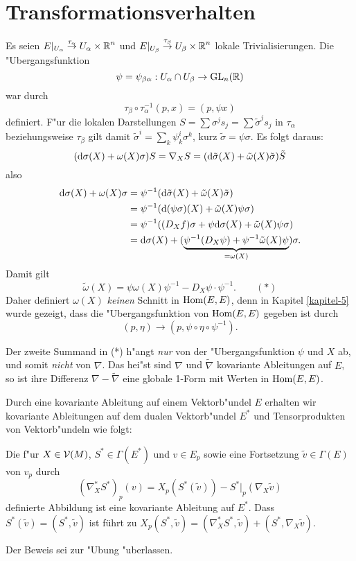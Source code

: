 \section{Transformationsverhalten}

Es seien $E|_{U_\alpha} \overset{\tau_\alpha}{\to} U_\alpha \times \operatorname{\mathbb{R}}^n$ und $E|_{U_\beta} \overset{\tau_\beta}{\to} U_{\beta} \times \operatorname{\mathbb{R}}^n$ lokale Trivialisierungen. Die "Ubergangsfunktion
	\[ \psi = \psi_{\beta\alpha}: U_\alpha \cap U_\beta \to \operatorname{GL}_n(\operatorname{\mathbb{R}}) \]
war durch
	\[ \tau_\beta \circ \tau_\alpha^{-1} (p,x) = (p, \psi x) \]
definiert. F"ur die lokalen Darstellungen $S = \sum \sigma^j s_j = \sum \tilde\sigma^j s_j$ in $\tau_\alpha$ beziehungsweise $\tau_\beta$ gilt damit $\tilde\sigma^{i} = \sum_k \psi_k^{i} \sigma^k$, kurz $\tilde\sigma = \psi \sigma$. Es folgt daraus:
	\[ (\mathrm{d} \sigma(X) + \omega(X) \sigma) S = \nabla_X S = (\mathrm{d} \tilde\sigma(X) + \tilde\omega(X)\tilde\sigma) \tilde S \]
also
\begin{align*}
	\mathrm{d} \sigma(X) + \omega(X) \sigma &= \psi^{-1}(\mathrm{d} \tilde\sigma(X) + \tilde\omega(X) \tilde\sigma)\\
	&= \psi^{-1} (\mathrm{d}(\psi\sigma)(X) + \tilde\omega(X) \psi \sigma)\\
	&= \psi^{-1} ((D_X f) \sigma + \psi \mathrm{d} \sigma(X) + \tilde\omega(X) \psi \sigma)\\
	&= \mathrm{d} \sigma(X) + (\underbrace{\psi^{-1}(D_X \psi) + \psi^{-1} \tilde\omega(X) \psi}_{=\omega(X)}) \sigma.
\end{align*}
Damit gilt
	\[ \tilde\omega(X) = \psi \omega(X) \psi^{-1} - D_X \psi \cdot \psi^{-1}. \qquad (*) \]
Daher definiert $\omega(X)$ \emph{keinen} Schnitt in $\operatorname{Hom}(E, E)$, denn in Kapitel \ref{kapitel-5} wurde gezeigt, dass die "Ubergangsfunktion von $\operatorname{Hom}(E, E)$ gegeben ist durch
	\[ (p, \eta) \to (p, \psi \circ \eta \circ \psi^{-1}). \]

\begin{bem}
Der zweite Summand in (*) h"angt \emph{nur} von der "Ubergangsfunktion $\psi$ und $X$ ab, und somit \emph{nicht} von $\nabla$. Das hei"st sind $\nabla$ und $\tilde\nabla$ kovariante Ableitungen auf $E$, so ist ihre Differenz $\nabla - \tilde\nabla$ eine globale 1-Form mit Werten in $\operatorname{Hom}(E,E)$.
\end{bem}

Durch eine kovariante Ableitung auf einem Vektorb"undel $E$ erhalten wir kovariante Ableitungen auf dem dualen Vektorb"undel $E^*$ und Tensorprodukten von Vektorb"undeln wie folgt:

\begin{Prop}\label{prop-7-3}
Die f"ur $X \in \operatorname{\mathcal{V}}(M)$, $S^* \in \Gamma(E^*)$ und $v \in E_p$ sowie eine Fortsetzung $\tilde v \in \Gamma(E)$ von $v_p$ durch
	\[ (\nabla_X^* S^*)_p(v) = X_p(S^*(\tilde v)) - S^*|_p (\nabla_X \tilde v) \]
definierte Abbildung ist eine kovariante Ableitung auf $E^*$. Dass $S^*(\tilde v) = (S^*, \tilde v)$ ist führt zu $X_p(S^*, \tilde v) = (\nabla_X^* S^*, \tilde v) + (S^*, \nabla_X \tilde v)$.
\end{Prop}
Der Beweis sei zur "Ubung "uberlassen.

